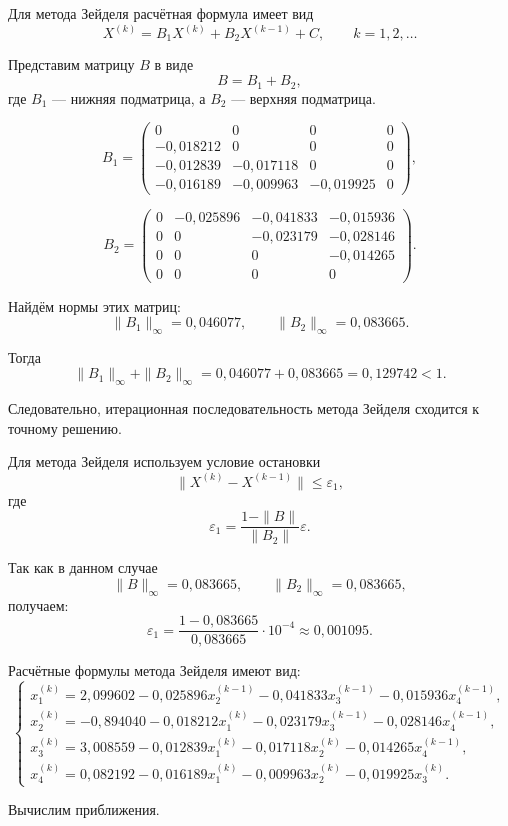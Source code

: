 Для метода Зейделя расчётная формула имеет вид
\[
X^{(k)}=B_1X^{(k)}+B_2X^{(k-1)}+C,
\qquad k=1,2,\ldots
\]

Представим матрицу $B$ в виде
\[
B=B_1+B_2,
\]
где $B_1$ --- нижняя подматрица, а $B_2$ --- верхняя подматрица.

\[
B_1=
\begin{pmatrix}
0 & 0 & 0 & 0\\
-0{,}018212 & 0 & 0 & 0\\
-0{,}012839 & -0{,}017118 & 0 & 0\\
-0{,}016189 & -0{,}009963 & -0{,}019925 & 0
\end{pmatrix},
\]

\[
B_2=
\begin{pmatrix}
0 & -0{,}025896 & -0{,}041833 & -0{,}015936\\
0 & 0 & -0{,}023179 & -0{,}028146\\
0 & 0 & 0 & -0{,}014265\\
0 & 0 & 0 & 0
\end{pmatrix}.
\]

Найдём нормы этих матриц:
\[
\|B_1\|_{\infty}=0{,}046077,
\qquad
\|B_2\|_{\infty}=0{,}083665.
\]

Тогда
\[
\|B_1\|_{\infty}+\|B_2\|_{\infty}
=
0{,}046077+0{,}083665
=
0{,}129742<1.
\]

Следовательно, итерационная последовательность метода Зейделя сходится к точному решению.

Для метода Зейделя используем условие остановки
\[
\|X^{(k)}-X^{(k-1)}\|
\leq
\varepsilon_1,
\]
где
\[
\varepsilon_1=
\frac{1-\|B\|}{\|B_2\|}\varepsilon.
\]

Так как в данном случае
\[
\|B\|_{\infty}=0{,}083665,
\qquad
\|B_2\|_{\infty}=0{,}083665,
\]
получаем:
\[
\varepsilon_1=
\frac{1-0{,}083665}{0{,}083665}\cdot10^{-4}
\approx0{,}001095.
\]

Расчётные формулы метода Зейделя имеют вид:
\[
\begin{cases}
x_1^{(k)}=2{,}099602-0{,}025896x_2^{(k-1)}-0{,}041833x_3^{(k-1)}-0{,}015936x_4^{(k-1)},\\
x_2^{(k)}=-0{,}894040-0{,}018212x_1^{(k)}-0{,}023179x_3^{(k-1)}-0{,}028146x_4^{(k-1)},\\
x_3^{(k)}=3{,}008559-0{,}012839x_1^{(k)}-0{,}017118x_2^{(k)}-0{,}014265x_4^{(k-1)},\\
x_4^{(k)}=0{,}082192-0{,}016189x_1^{(k)}-0{,}009963x_2^{(k)}-0{,}019925x_3^{(k)}.
\end{cases}
\]

Вычислим приближения.

